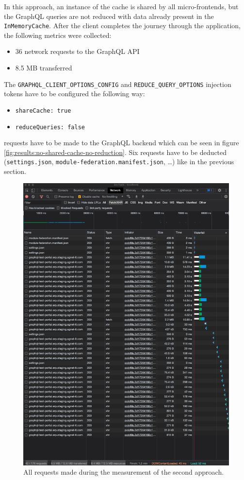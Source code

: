 In this approach, an instance of the cache is shared by all micro-frontends, but the GraphQL queries are not reduced with data already present in the \texttt{InMemoryCache}. After the client completes the journey through the application, the following metrics were collected:

\begin{itemize}
  \item 36 network requests to the GraphQL \ac{API}
  \item 8.5 MB transferred
\end{itemize}

\noindent The \texttt{GRAPHQL\_CLIENT\_OPTIONS\_CONFIG} and \texttt{REDUCE\_QUERY\_OPTIONS} injection tokens have to be configured the following way:

\begin{itemize}
  \item \texttt{shareCache: true}
  \item \texttt{reduceQueries: false}
\end{itemize}

 requests have to be made to the GraphQL backend which can be seen in figure \ref{fig:results:no-shared-cache-no-reduction}. Six requests have to be deducted (\texttt{settings.json}, \texttt{module-federation.manifest.json}, \dots) like in the previous section.

\ifshowImages
\begin{figure}[H]
\centering
\includegraphics[width=0.6\linewidth]{images/results/1-attempt/shared-not-reduced-cache.png}
\caption{All requests made during the measurement of the second approach.}\label{fig:results:shared-cache-no-reduction}
\end{figure}
\fi

